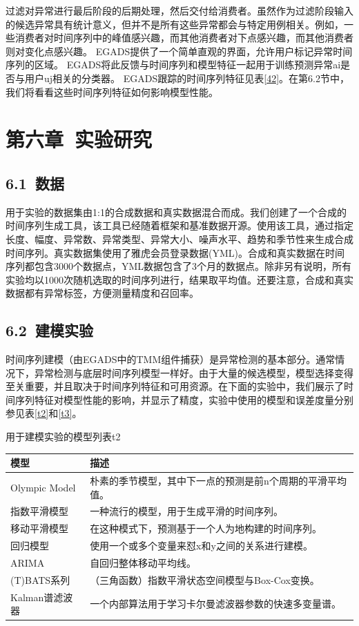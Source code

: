 \documentclass[a4paper,AutoFakeBold,oneside,12pt]{book}
\begin{document}
过滤对异常进行最后阶段的后期处理，然后交付给消费者。虽然作为过滤阶段输入的候选异常具有统计意义，但并不是所有这些异常都会与特定用例相关。例如，一些消费者对时间序列中的峰值感兴趣，而其他消费者对下点感兴趣，而其他消费者则对变化点感兴趣。 EGADS提供了一个简单直观的界面，允许用户标记异常时间序列的区域。 EGADS将此反馈与时间序列和模型特征一起用于训练预测异常ai是否与用户uj相关的分类器。 EGADS跟踪的时间序列特征见表\ref{42}。在第6.2节中，我们将看看这些时间序列特征如何影响模型性能。


\chapter*{第六章\ 实验研究}

\section*{6.1\ 数据}
用于实验的数据集由1:1的合成数据和真实数据混合而成。我们创建了一个合成的时间序列生成工具，该工具已经随着框架和基准数据开源。使用该工具，通过指定长度、幅度、异常数、异常类型、异常大小、噪声水平、趋势和季节性来生成合成时间序列。真实数据集使用了雅虎会员登录数据(YML)。合成和真实数据在时间序列都包含3000个数据点，YML数据包含了3个月的数据点。除非另有说明，所有实验均以1000次随机选取的时间序列进行，结果取平均值。还要注意，合成和真实数据都有异常标签，方便测量精度和召回率。

\section*{6.2\ 建模实验}
时间序列建模（由EGADS中的TMM组件捕获）是异常检测的基本部分。通常情况下，异常检测与底层时间序列模型一样好。由于大量的候选模型，模型选择变得至关重要，并且取决于时间序列特征和可用资源。在下面的实验中，我们展示了时间序列特征对模型性能的影响，并显示了精度，实验中使用的模型和误差度量分别参见表\ref{t2}和\ref{t3}。

\begin{bupttable}{用于建模实验的模型列表}{t2}
    \begin{tabular}{l|l}
		\hline \textbf{模型} & \textbf{描述} \\
		\hline Olympic Model & 朴素的季节模型，其中下一点的预测是前n个周期的平滑平均值。 \\
		\hline 指数平滑模型 & 一种流行的模型，用于生成平滑的时间序列。  \\
		\hline 移动平滑模型 & 在这种模式下，预测基于一个人为地构建的时间序列。  \\
		\hline 回归模型 & 使用一个或多个变量来怼x和y之间的关系进行建模。\\
		\hline ARIMA & 自回归整体移动平均线。  \\
		\hline (T)BATS系列 & （三角函数）指数平滑状态空间模型与Box-Cox变换。  \\
		\hline Kalman谱滤波器 & 一个内部算法用于学习卡尔曼滤波器参数的快速多变量谱。  \\
		\hline
    \end{tabular}
\end{bupttable}
\end{document}
